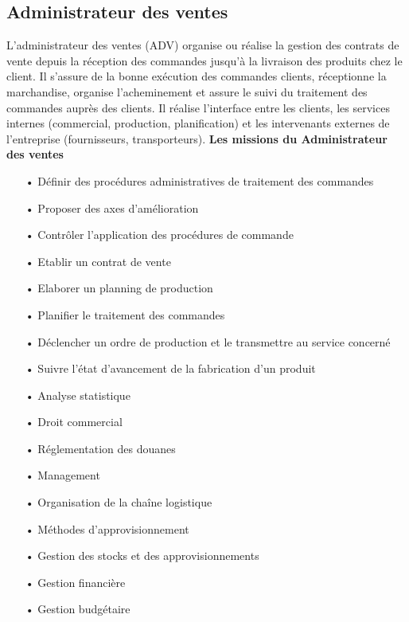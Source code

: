 \documentclass[edit,12pt,a4paper,ChapStyle,oneside,doubleinterligne]{report}
\begin{document}
\subsection{Administrateur des ventes}
L’administrateur des ventes (ADV) organise ou réalise la gestion des contrats de vente depuis la réception des commandes jusqu'à la livraison des produits chez le client. Il s’assure de la bonne exécution des commandes clients, réceptionne la marchandise, organise l’acheminement et assure le suivi du traitement des commandes auprès des clients. Il réalise l'interface entre les clients, les services internes (commercial, production, planification) et les intervenants externes de l'entreprise (fournisseurs, transporteurs).
\cite{Administrateur}\newline\textbf{Les missions du  Administrateur des ventes}\newline
\begin{itemize}
    \item [•] Définir des procédures administratives de traitement des commandes 
    \item [•] Proposer des axes d'amélioration 
    \item [•] Contrôler l'application des procédures de commande 
    \item [•] Etablir un contrat de vente 
    \item [•] Elaborer un planning de production
    \item [•] Planifier le traitement des commandes 
    \item [•] Déclencher un ordre de production et le transmettre au service concerné 
    \item [•] Suivre l'état d'avancement de la fabrication d'un produit 
    \item [•] Analyse statistique
    \item [•] Droit commercial
    \item [•] Réglementation des douanes
    \item [•] Management
    \item [•] Organisation de la chaîne logistique
    \item [•] Méthodes d'approvisionnement
    \item [•] Gestion des stocks et des approvisionnements
    \item [•] Gestion financière
    \item [•] Gestion budgétaire
\end{itemize}
\end{document}
